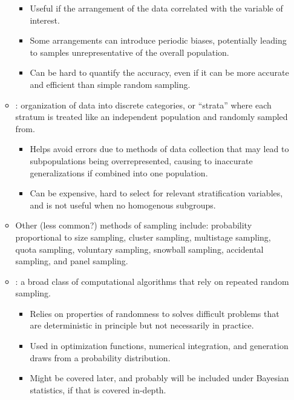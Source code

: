 \begin{itemize}
\begin{itemize}
\begin{itemize}
        \item Useful if the arrangement of the data correlated with the variable of interest.
        \item Some arrangements can introduce periodic biases, potentially leading to samples unrepresentative of the overall population.
        \item Can be hard to quantify the accuracy, even if it can be more accurate and efficient than simple random sampling.
      \end{itemize}
    \item {}: organization of data into discrete categories, or ``strata'' where each stratum is treated like an independent population and randomly sampled from.
      \begin{itemize}
        \item Helps avoid errors due to methods of data collection that may lead to subpopulations being overrepresented, causing to inaccurate generalizations if combined into one population. 
        \item Can be expensive, hard to select for relevant stratification variables, and is not useful when no homogenous subgroups.
      \end{itemize}
     \item Other (less common?) methods of sampling include: probability proportional to size sampling, cluster sampling, multistage sampling, quota sampling, voluntary sampling, snowball sampling, accidental sampling, and panel sampling.
     \item {}: a broad class of computational algorithms that rely on repeated random sampling.
      \begin{itemize}
        \item Relies on properties of randomness to solves difficult problems that are deterministic in principle but not necessarily in practice.
        \item Used in optimization functions, numerical integration, and generation draws from a probability distribution. 
        \item Might be covered later, and probably will be included under Bayesian statistics, if that is covered in-depth.
      \end{itemize}
  \end{itemize}
  

\end{itemize}
